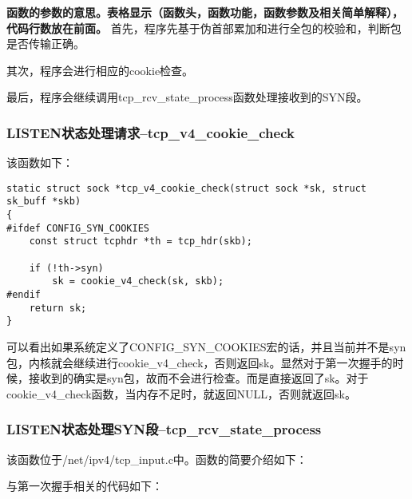 \documentclass[11pt, a4paper,oneside]{book}
\theoremstyle{ocrenumbox}
\theoremstyle{purplenumbox}
\theoremstyle{blackbox}
\begin{document}
                \textbf{函数的参数的意思。表格显示（函数头，函数功能，函数参数及相关简单解释），代码行数放在前面。}
                首先，程序先基于伪首部累加和进行全包的校验和，判断包是否传输正确。

                其次，程序会进行相应的cookie检查。

                最后，程序会继续调用tcp\_rcv\_state\_process函数处理接收到的SYN段。
            
	\subsubsection{LISTEN状态处理请求--tcp\_v4\_cookie\_check}
                该函数如下：
\begin{verbatim}
static struct sock *tcp_v4_cookie_check(struct sock *sk, struct sk_buff *skb)
{
#ifdef CONFIG_SYN_COOKIES
	const struct tcphdr *th = tcp_hdr(skb);

	if (!th->syn)
		sk = cookie_v4_check(sk, skb);
#endif
	return sk;
}
\end{verbatim}

                可以看出如果系统定义了CONFIG\_SYN\_COOKIES宏的话，并且当前并不是syn包，内核就会继续进行cookie\_v4\_check，否则返回sk。显然对于第一次握手的时候，接收到的确实是syn包，故而不会进行检查。而是直接返回了sk。对于cookie\_v4\_check函数，当内存不足时，就返回NULL，否则就返回sk。
            \subsubsection{LISTEN状态处理SYN段--tcp\_rcv\_state\_process}
                该函数位于/net/ipv4/tcp\_input.c中。函数的简要介绍如下：

                与第一次握手相关的代码如下：
\end{document}
